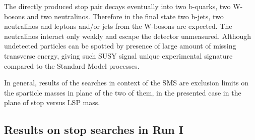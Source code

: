 The directly produced stop pair decays eventually into two b-quarks, two W-bosons and two neutralinos. Therefore in the final state two b-jets, two neutralinos and leptons and/or jets from the W-bosons are expected. The neutralinos interact only weakly and escape the detector unmeasured. Although undetected particles can be spotted by presence of large amount of missing transverse energy, giving such SUSY signal unique experimental signature compared to the Standard Model processes.

In general, results of the searches in context of the SMS are exclusion limits on the sparticle masses in plane of the two of them, in the presented case in the plane of stop versus LSP mass.





\subsection{Results on stop searches in Run I}


